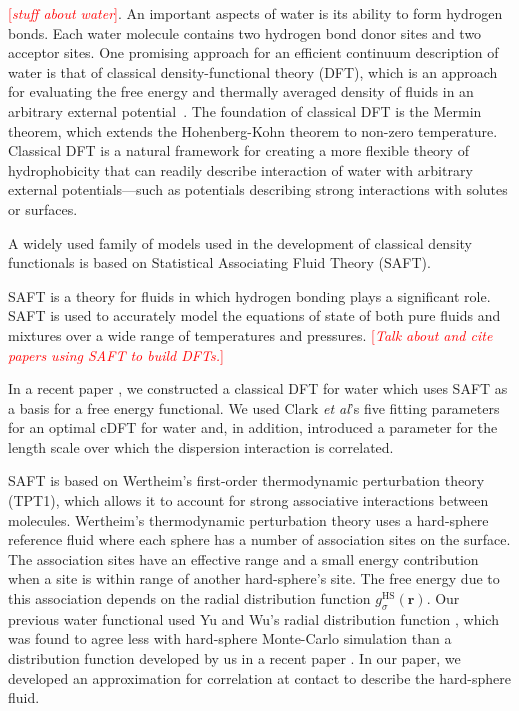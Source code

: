 \documentclass[twocolumn,amsmath,amssymb,prl]{revtex4-1}
\newcommand{\rr}{\textbf{r}}
\newcommand{\fixme}[1]{\textcolor{red}{[\emph{#1}]}}
\begin{document}
\fixme{stuff about water}.  An important aspects of water
is its ability to form hydrogen bonds.  Each water molecule contains
two hydrogen bond donor sites and two acceptor sites.
%
One promising approach for an efficient continuum description of water
is that of classical density-functional theory (DFT), which is an
approach for evaluating the free energy and thermally averaged density
of fluids in an arbitrary external potential~\cite{ebner1976density}.
The foundation of classical DFT is the Mermin
theorem\cite{mermin1965thermal}, which extends the Hohenberg-Kohn
theorem\cite{hohenberg1964inhomogeneous} to non-zero temperature.
Classical DFT is a natural framework for creating a more flexible
theory of hydrophobicity that can readily describe interaction of
water with arbitrary external potentials---such as potentials
describing strong interactions with solutes or surfaces.

A widely used family of models used in the development of classical
density functionals is based on Statistical Associating Fluid Theory
(SAFT).

SAFT is a theory for fluids in which hydrogen bonding plays a significant
role\cite{chapman1989saft, muller2001molecular}. SAFT is used to
accurately model the equations of state of both pure fluids and
mixtures over a wide range of temperatures and pressures.
\fixme{Talk about and cite papers using SAFT to build DFTs.}

In a recent paper \cite{hughes2013classical}, we constructed a
classical DFT for water which uses SAFT as a basis for a free energy
functional. We used Clark \emph{et al}'s \cite{clark2006developing}
five fitting parameters for an optimal cDFT for water and, in
addition, introduced a parameter for the length scale over which the
dispersion interaction is correlated.

SAFT is based on Wertheim's first-order thermodynamic perturbation
theory (TPT1)\cite{wertheim1984fluidsI, wertheim1984fluidsII,
  wertheim1986fluidsIII, wertheim1986fluidsIV}, which allows it to
account for strong associative interactions between
molecules. Wertheim's thermodynamic perturbation theory uses a
hard-sphere reference fluid where each sphere has a number of
association sites on the surface. The association sites have an
effective range and a small energy contribution when a site is within
range of another hard-sphere's site. The free energy due to this
association depends on the radial distribution function
$g_\sigma^\text{HS}(\rr)$. Our previous water functional used Yu and
Wu's radial distribution function
\cite{yu2002fmt-dft-inhomogeneous-associating}, which was found to
agree less with hard-sphere Monte-Carlo simulation than a distribution
function developed by us in a recent paper \cite{schulte2012using}. In
our paper, we developed an approximation for correlation at
contact to describe the hard-sphere fluid.
\end{document}
